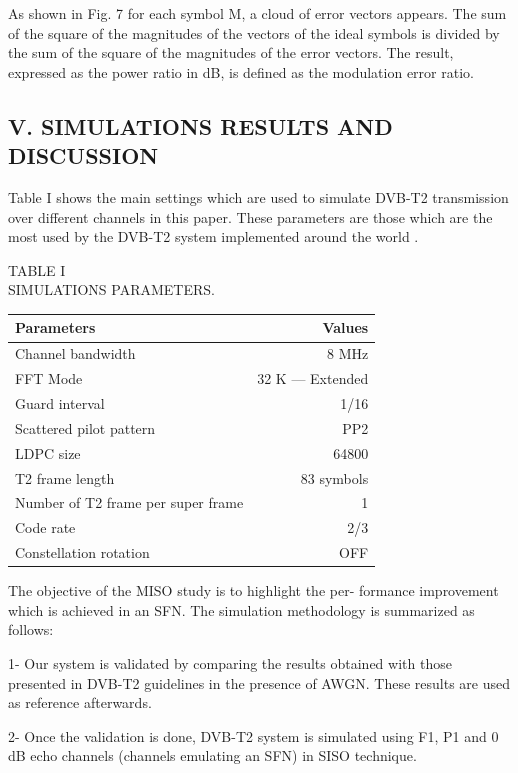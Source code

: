 \documentclass[10pt, conference]{IEEEtran}
\begin{document}
{\noindent As shown in Fig. 7 for each symbol M, a cloud of error
vectors appears. The sum of the square of the magnitudes
of the vectors of the ideal symbols is divided by the sum
of the square of the magnitudes of the error vectors. The
result, expressed as the power ratio in dB, is defined as
the modulation error ratio.

\begin{adjustwidth}{0.5cm}{0cm}
\section*{ {\scriptsize  \textmd{V. SIMULATIONS RESULTS AND DISCUSSION}}}
\end{adjustwidth}

\begin{adjustwidth}{-0.13cm}{0cm}
 Table I shows the main settings which are used to simulate
DVB-T2 transmission over different channels in this paper.
These parameters are those which are the most used by the
DVB-T2 system implemented around the world \cite{20}.
\end{adjustwidth}

\begin{table}[!htbp]
\centering
{\small
\begin{center}
{\small TABLE I\\
SIMULATIONS PARAMETERS.}
\end{center}

\begin{tabular}{|l|r|}
\hline
Parameters & Values \\
\hline
Channel bandwidth & 8 MHz \\
\hline
FFT Mode & 32 K — Extended \\
\hline
Guard interval & 1/16 \\
\hline
Scattered pilot pattern & PP2 \\
\hline
LDPC size & 64800 \\
\hline
T2 frame length & 83 symbols \\
\hline
Number of T2 frame per super frame & 1 \\
\hline
Code rate & 2/3 \\
\hline
Constellation rotation & OFF \\

\hline
\end{tabular}
}
\end{table}

The objective of the MISO study is to highlight the per-
formance improvement which is achieved in an SFN. The
simulation methodology is summarized as follows:

1- Our system is validated by comparing the results obtained
with those presented in DVB-T2 guidelines in the presence of
AWGN. These results are used as reference afterwards.

2- Once the validation is done, DVB-T2 system is simulated
using F1, P1 and 0 dB echo channels (channels emulating an
SFN) in SISO technique.
}
\end{document}
